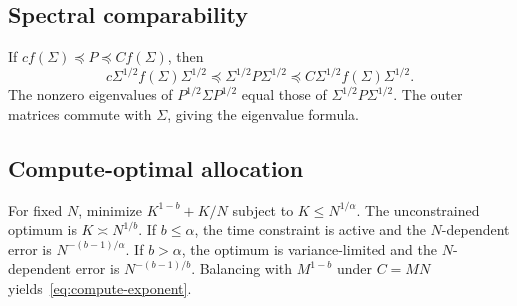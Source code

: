 \documentclass[11pt]{article}
\begin{document}
\subsection{Spectral comparability}

If $c f(\Sigma)\preceq P\preceq C f(\Sigma)$, then
\begin{equation}
    c\Sigma^{1/2}f(\Sigma)\Sigma^{1/2}
    \preceq
    \Sigma^{1/2}P\Sigma^{1/2}
    \preceq
    C\Sigma^{1/2}f(\Sigma)\Sigma^{1/2}.
\end{equation}
The nonzero eigenvalues of $P^{1/2}\Sigma P^{1/2}$ equal those of $\Sigma^{1/2}P\Sigma^{1/2}$.  The outer matrices commute with $\Sigma$, giving the eigenvalue formula.

\subsection{Compute-optimal allocation}

For fixed $N$, minimize $K^{1-b}+K/N$ subject to $K\le N^{1/\alpha}$.  The unconstrained optimum is $K\asymp N^{1/b}$.  If $b\le\alpha$, the time constraint is active and the $N$-dependent error is $N^{-(b-1)/\alpha}$.  If $b>\alpha$, the optimum is variance-limited and the $N$-dependent error is $N^{-(b-1)/b}$.  Balancing with $M^{1-b}$ under $C=MN$ yields~\eqref{eq:compute-exponent}.



\end{document}
